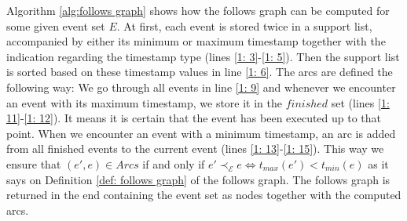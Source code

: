 Algorithm \ref{alg:follows graph} shows how the follows graph can be computed for some given event set $E$.
At first, each event is stored twice in a support list, accompanied by either its minimum or maximum timestamp together with the indication regarding the timestamp type (lines \ref{1: 3}-\ref{1: 5}).
Then the support list is sorted based on these timestamp values in line \ref{1: 6}.
The arcs are defined the following way:
We go through all events in line \ref{1: 9} and whenever we encounter an event with its maximum timestamp, we store it in the $finished$ set (lines \ref{1: 11}-\ref{1: 12}).
It means it is certain that the event has been executed up to that point.
When we encounter an event with a minimum timestamp, an arc is added from all finished events to the current event (lines \ref{1: 13}-\ref{1: 15}).
This way we ensure that $(e',e) \in Arcs$ if and only if $e' \prec_{\mathcal{E}} e \Leftrightarrow t_{max}(e') < t_{min}(e)$ as it says on Definition \ref{def: follows graph} of the follows graph.
The follows graph is returned in the end containing the event set as nodes together with the computed arcs.\\ 
%
%
%
%
%
%
